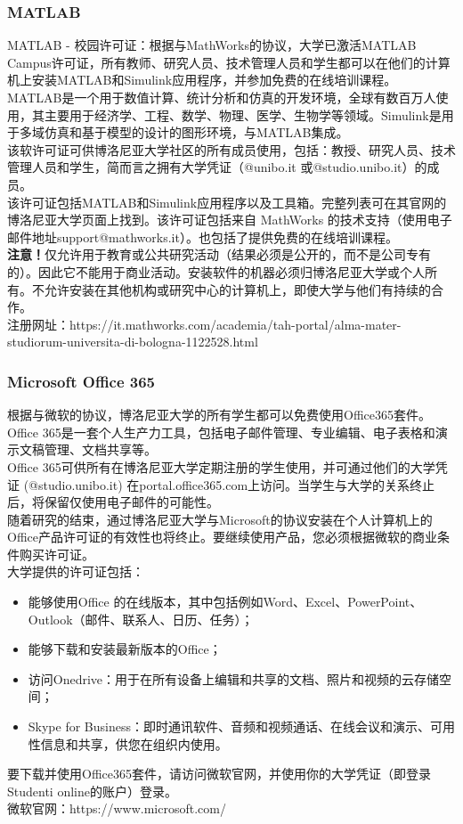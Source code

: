 \subsubsection{MATLAB}
MATLAB - 校园许可证：根据与MathWorks的协议，大学已激活MATLAB Campus许可证，所有教师、研究人员、技术管理人员和学生都可以在他们的计算机上安装MATLAB和Simulink应用程序，并参加免费的在线培训课程。\\
MATLAB是一个用于数值计算、统计分析和仿真的开发环境，全球有数百万人使用，其主要用于经济学、工程、数学、物理、医学、生物学等领域。Simulink是用于多域仿真和基于模型的设计的图形环境，与MATLAB集成。\\
该软许可证可供博洛尼亚大学社区的所有成员使用，包括：教授、研究人员、技术管理人员和学生，简而言之拥有大学凭证（@unibo.it 或@studio.unibo.it）的成员。\\
该许可证包括MATLAB和Simulink应用程序以及工具箱。完整列表可在其官网的博洛尼亚大学页面上找到。该许可证包括来自 MathWorks 的技术支持（使用电子邮件地址support@mathworks.it）。也包括了提供免费的在线培训课程。\\
\textbf{注意！}仅允许用于教育或公共研究活动（结果必须是公开的，而不是公司专有的）。因此它不能用于商业活动。安装软件的机器必须归博洛尼亚大学或个人所有。不允许安装在其他机构或研究中心的计算机上，即使大学与他们有持续的合作。\\
注册网址：https://it.mathworks.com/academia/tah-portal/alma-mater-studiorum-universita-di-bologna-1122528.html

\subsubsection{Microsoft Office 365}
根据与微软的协议，博洛尼亚大学的所有学生都可以免费使用Office365套件。\\
Office 365是一套个人生产力工具，包括电子邮件管理、专业编辑、电子表格和演示文稿管理、文档共享等。\\
Office 365可供所有在博洛尼亚大学定期注册的学生使用，并可通过他们的大学凭证 (@studio.unibo.it) 在portal.office365.com上访问。当学生与大学的关系终止后，将保留仅使用电子邮件的可能性。\\
随着研究的结束，通过博洛尼亚大学与Microsoft的协议安装在个人计算机上的Office产品许可证的有效性也将终止。要继续使用产品，您必须根据微软的商业条件购买许可证。\\
大学提供的许可证包括：
\begin{itemize}
 \item 能够使用Office 的在线版本，其中包括例如Word、Excel、PowerPoint、Outlook（邮件、联系人、日历、任务）；
 \item 能够下载和安装最新版本的Office； 
 \item 访问Onedrive：用于在所有设备上编辑和共享的文档、照片和视频的云存储空间；
 \item Skype for Business：即时通讯软件、音频和视频通话、在线会议和演示、可用性信息和共享，供您在组织内使用。
\end{itemize}
要下载并使用Office365套件，请访问微软官网，并使用你的大学凭证（即登录Studenti online的账户）登录。\\
微软官网：https://www.microsoft.com/

